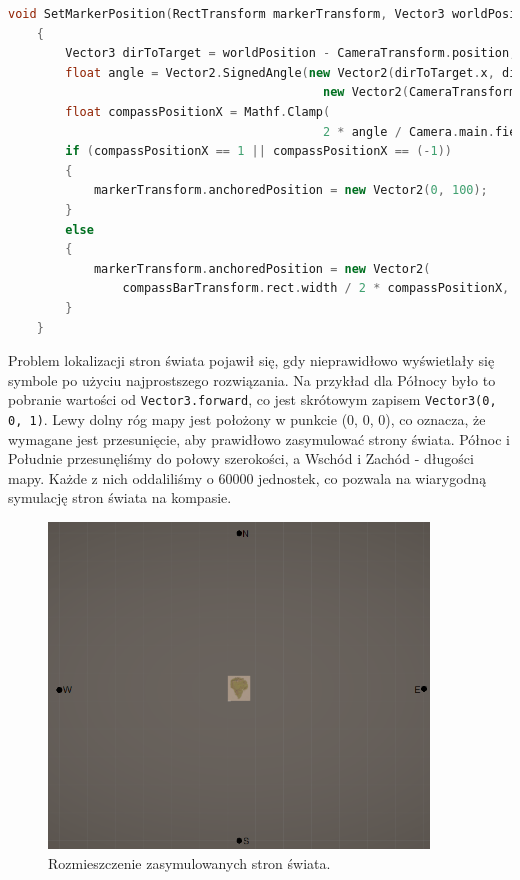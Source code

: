  \begin{minipage}{\textwidth}
    \begin{lstlisting}[language=C++, caption=Fragment kodu odpowiedzialny za ustawienie symbolu na pasku kompasu]
    void SetMarkerPosition(RectTransform markerTransform, Vector3 worldPosition)
    {
        Vector3 dirToTarget = worldPosition - CameraTransform.position;
        float angle = Vector2.SignedAngle(new Vector2(dirToTarget.x, dirToTarget.z), 
                                            new Vector2(CameraTransform.transform.forward.x, CameraTransform.transform.forward.z));
        float compassPositionX = Mathf.Clamp(
                                            2 * angle / Camera.main.fieldOfView, -1, 1);
        if (compassPositionX == 1 || compassPositionX == (-1))
        {
            markerTransform.anchoredPosition = new Vector2(0, 100);
        }
        else
        {
            markerTransform.anchoredPosition = new Vector2(
                compassBarTransform.rect.width / 2 * compassPositionX, 0);
        }
    }
    \end{lstlisting}
 \end{minipage}

Problem lokalizacji stron świata pojawił się, gdy nieprawidłowo wyświetlały się symbole po użyciu najprostszego rozwiązania. Na przykład dla Północy było to
pobranie wartości od \texttt{Vector3.forward}, co jest skrótowym zapisem \texttt{Vector3(0, 0, 1)}. Lewy dolny róg mapy jest położony w punkcie (0, 0, 0), co oznacza, że wymagane
 jest przesunięcie, aby prawidłowo zasymulować strony świata. Północ i Południe przesunęliśmy do połowy szerokości, a Wschód i Zachód - długości mapy. Każde z nich
  oddaliliśmy o 60000 jednostek, co pozwala na wiarygodną symulację stron świata na kompasie.

\begin{figure}[htbp]
    \centering
    \includegraphics[width=0.9\textwidth]{images/ui/strony_swiata.png}
    \caption{Rozmieszczenie zasymulowanych stron świata.}\label{fig:world_sides}
\end{figure}

